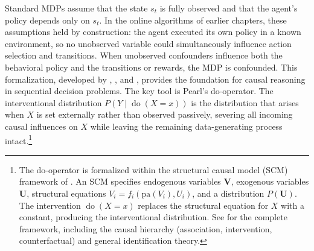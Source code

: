 Standard MDPs assume that the state $s_t$ is fully observed and that the agent's policy depends only on $s_t$. In the online algorithms of earlier chapters, these assumptions held by construction: the agent executed its own policy in a known environment, so no unobserved variable could simultaneously influence action selection and transitions. When unobserved confounders influence both the behavioral policy and the transitions or rewards, the MDP is confounded. This formalization, developed by \citet{zhang2019near}, \citet{zhang2020causal}, and \citet{kallus2020confounding}, provides the foundation for causal reasoning in sequential decision problems. The key tool is Pearl's do-operator. The interventional distribution $P(Y \mid \operatorname{do}(X = x))$ is the distribution that arises when $X$ is set externally rather than observed passively, severing all incoming causal influences on $X$ while leaving the remaining data-generating process intact.\footnote{The do-operator is formalized within the structural causal model (SCM) framework of \citet{pearl2009causality}. An SCM specifies endogenous variables $\mathbf{V}$, exogenous variables $\mathbf{U}$, structural equations $V_i = f_i(\text{pa}(V_i), U_i)$, and a distribution $P(\mathbf{U})$. The intervention $\operatorname{do}(X = x)$ replaces the structural equation for $X$ with a constant, producing the interventional distribution. See \citet{pearl2009causality} for the complete framework, including the causal hierarchy (association, intervention, counterfactual) and general identification theory.}

